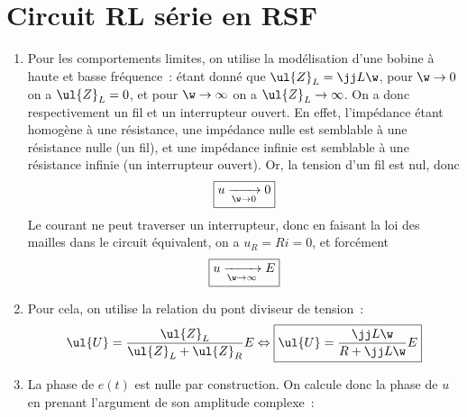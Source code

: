\documentclass[a4paper, 12pt, final, garamond]{book}
\begin{document}
\section{Circuit RL série en RSF}
\begin{enumerate}
	\item Pour les comportements limites, on utilise la modélisation d'une
	      bobine à haute et basse fréquence~: étant donné que $\ul{Z}_L = \jj L
		      \w$, pour $\w\rightarrow0$ on a $\ul{Z}_L = 0$, et pour
	      $\w\rightarrow\infty$ on a $\ul{Z}_L \rightarrow \infty$. On a donc
	      respectivement un fil et un interrupteur ouvert. En effet, l'impédance
	      étant homogène à une résistance, une impédance nulle est semblable à une
	      résistance nulle (un fil), et une impédance infinie est semblable à une
	      résistance infinie (un interrupteur ouvert). \bigbreak
	      Or, la tension d'un fil est nul, donc
	      \[\boxed{u \xrightarrow[\w\rightarrow0]{} 0}\]
	      Le courant ne peut traverser un interrupteur, donc en faisant la loi des
	      mailles dans le circuit équivalent, on a $u_R = Ri = 0$, et forcément
	      \[\boxed{u \xrightarrow[\w\rightarrow\infty]{} E}\]
	\item Pour cela, on utilise la relation du pont diviseur de tension~:
	      \begin{gather*}
		      \ul{U}
		      = \frac{\ul{Z}_L}{\ul{Z}_L + \ul{Z}_R}E
		      \Leftrightarrow
		      \boxed{\ul{U}
			      = \frac{\jj L\w}{R + \jj L \w}E}
	      \end{gather*}

	\item La phase de $e(t)$ est nulle par construction. On calcule donc la
	      phase de $u$ en prenant l'argument de son amplitude complexe~:


\end{enumerate}
\end{document}
